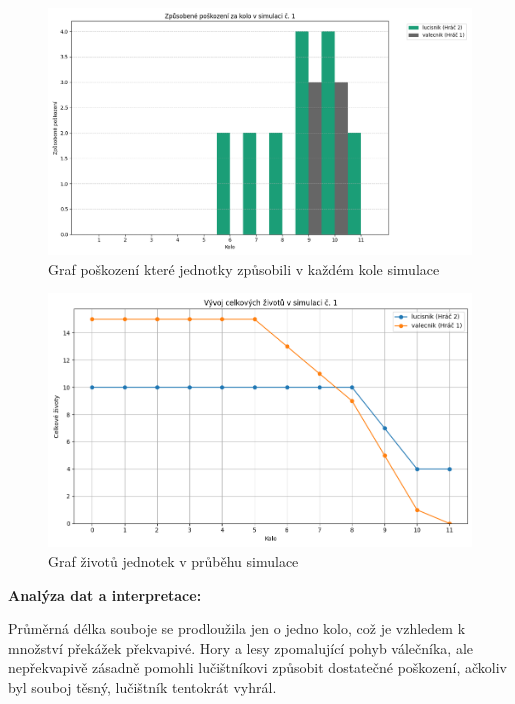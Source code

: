 \begin{figure}
  \centering      %
  \includegraphics[scale=0.5]{obr/graf_valVSluc_nonflat_damage.png} %
  \caption{Graf poškození které jednotky způsobili v každém kole simulace} %
  \label{graf_valVSluc_nonflat_damage} %
\end{figure}

\begin{figure}
  \centering      %
  \includegraphics[scale=0.5]{obr/graf_valVSluc_nonflat_HP.png} %
  \caption{Graf životů jednotek v průběhu simulace} %
  \label{graf_valVSluc_nonflat_HP} %
\end{figure}

\textbf{Analýza dat a interpretace:}

Průměrná délka souboje se prodloužila jen o jedno kolo, což je vzhledem k množství překážek překvapivé. Hory a lesy zpomalující pohyb válečníka, ale nepřekvapivě zásadně pomohli lučištníkovi způsobit dostatečné poškození, ačkoliv byl souboj těsný, lučištník tentokrát vyhrál.

